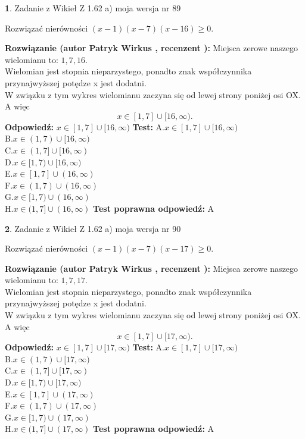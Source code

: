 \documentclass[12pt, a4paper]{article}
\theoremstyle{definition} %
\newtheorem{zad}{}
\newcommand{\zadStart}[1]{\begin{zad}#1\newline}
\newcommand{\zadStop}{\end{zad}}
\newcommand{\rozwStart}[2]{\noindent \textbf{Rozwiązanie (autor #1 , recenzent #2): }\newline}
\newcommand{\rozwStop}{\newline}
\newcommand{\odpStart}{\noindent \textbf{Odpowiedź:}\newline}
\newcommand{\odpStop}{\newline}
\newcommand{\testStart}{\noindent \textbf{Test:}\newline}
\newcommand{\testStop}{\newline}
\newcommand{\kluczStart}{\noindent \textbf{Test poprawna odpowiedź:}\newline}
\newcommand{\kluczStop}{\newline}
\begin{document}
\zadStart{Zadanie z Wikieł Z 1.62 a) moja wersja nr 89}

Rozwiązać nierówności $(x-1)(x-7)(x-16)\ge0$.
\zadStop
\rozwStart{Patryk Wirkus}{}
Miejsca zerowe naszego wielomianu to: $1, 7, 16$.\\
Wielomian jest stopnia nieparzystego, ponadto znak współczynnika przy\linebreak najwyższej potędze x jest dodatni.\\ W związku z tym wykres wielomianu zaczyna się od lewej strony poniżej osi OX. A więc $$x \in [1,7] \cup [16,\infty).$$
\rozwStop
\odpStart
$x \in [1,7] \cup [16,\infty)$
\odpStop
\testStart
A.$x \in [1,7] \cup [16,\infty)$\\
B.$x \in (1,7) \cup [16,\infty)$\\
C.$x \in (1,7] \cup [16,\infty)$\\
D.$x \in [1,7) \cup [16,\infty)$\\
E.$x \in [1,7] \cup (16,\infty)$\\
F.$x \in (1,7) \cup (16,\infty)$\\
G.$x \in [1,7) \cup (16,\infty)$\\
H.$x \in (1,7] \cup (16,\infty)$
\testStop
\kluczStart
A
\kluczStop



\zadStart{Zadanie z Wikieł Z 1.62 a) moja wersja nr 90}

Rozwiązać nierówności $(x-1)(x-7)(x-17)\ge0$.
\zadStop
\rozwStart{Patryk Wirkus}{}
Miejsca zerowe naszego wielomianu to: $1, 7, 17$.\\
Wielomian jest stopnia nieparzystego, ponadto znak współczynnika przy\linebreak najwyższej potędze x jest dodatni.\\ W związku z tym wykres wielomianu zaczyna się od lewej strony poniżej osi OX. A więc $$x \in [1,7] \cup [17,\infty).$$
\rozwStop
\odpStart
$x \in [1,7] \cup [17,\infty)$
\odpStop
\testStart
A.$x \in [1,7] \cup [17,\infty)$\\
B.$x \in (1,7) \cup [17,\infty)$\\
C.$x \in (1,7] \cup [17,\infty)$\\
D.$x \in [1,7) \cup [17,\infty)$\\
E.$x \in [1,7] \cup (17,\infty)$\\
F.$x \in (1,7) \cup (17,\infty)$\\
G.$x \in [1,7) \cup (17,\infty)$\\
H.$x \in (1,7] \cup (17,\infty)$
\testStop
\kluczStart
A
\kluczStop
\end{document}
